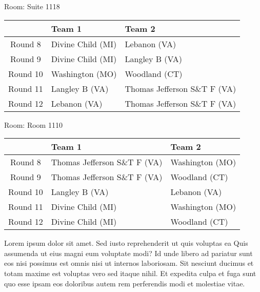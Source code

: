 \documentclass{article}%
\begin{document}
\vspace*{8pt}%
\linebreak%
\begin{flushleft}%
\begin{Large}%
Room: Suite 1118%
\end{Large}%
\end{flushleft}%
\begin{tabularx}{\textwidth}{|c|Y|Y|}%
\hline%
&Team 1&Team 2\\%
\hline%
Round 8&Divine Child (MI)&Lebanon (VA)\\%
Round 9&Divine Child (MI)&Langley B (VA)\\%
Round 10&Washington (MO)&Woodland (CT)\\%
Round 11&Langley B (VA)&Thomas Jefferson S\&T F (VA)\\%
Round 12&Lebanon (VA)&Thomas Jefferson S\&T F (VA)\\%
\hline%
\end{tabularx}%
\vspace*{8pt}%
\linebreak%
\begin{flushleft}%
\begin{Large}%
Room: Room 1110%
\end{Large}%
\end{flushleft}%
\begin{tabularx}{\textwidth}{|c|Y|Y|}%
\hline%
&Team 1&Team 2\\%
\hline%
Round 8&Thomas Jefferson S\&T F (VA)&Washington (MO)\\%
Round 9&Thomas Jefferson S\&T F (VA)&Woodland (CT)\\%
Round 10&Langley B (VA)&Lebanon (VA)\\%
Round 11&Divine Child (MI)&Washington (MO)\\%
Round 12&Divine Child (MI)&Woodland (CT)\\%
\hline%
\end{tabularx}%
\vspace*{8pt}%
\linebreak%
\newline%
Lorem ipsum dolor sit amet. Sed iusto reprehenderit ut quis voluptas ea Quis assumenda ut eius magni eum voluptate modi? Id unde libero ad pariatur sunt eos nisi possimus est omnis nisi ut internos laboriosam. Sit nesciunt ducimus et totam maxime est voluptas vero sed itaque nihil. Et expedita culpa et fuga sunt quo esse ipsam eos doloribus autem rem perferendis modi et molestiae vitae.\newline%
\end{document}
